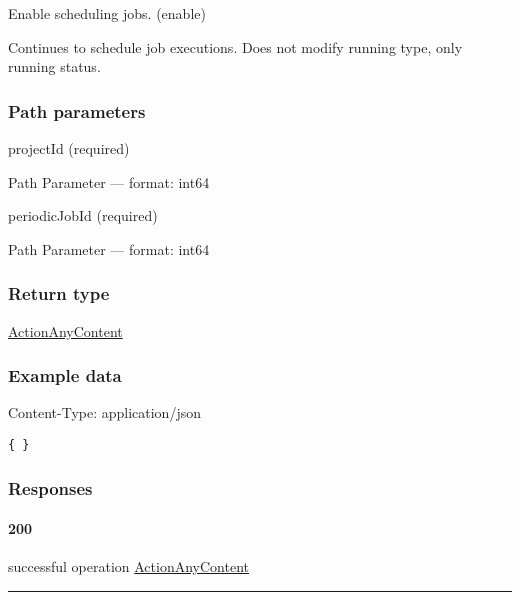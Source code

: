 Enable scheduling jobs. ({enable})

Continues to schedule job executions. Does not modify running type, only
running status.

\hypertarget{path-parameters-13}{%
\subsubsection*{Path parameters}\label{path-parameters-13}}

projectId (required)

{Path Parameter} --- format: int64

periodicJobId (required)

{Path Parameter} --- format: int64

\hypertarget{return-type-15}{%
\subsubsection*{Return type}\label{return-type-15}}

\protect\hyperlink{ActionAnyContent}{ActionAnyContent}

\hypertarget{example-data-15}{%
\subsubsection*{Example data}\label{example-data-15}}

Content-Type: application/json

\begin{verbatim}
{ }
\end{verbatim}

\hypertarget{responses-15}{%
\subsubsection*{Responses}\label{responses-15}}

\hypertarget{section-54}{%
\paragraph{200}\label{section-54}}

successful operation
\protect\hyperlink{ActionAnyContent}{ActionAnyContent}

\begin{center}\rule{0.5\linewidth}{0.5pt}\end{center}

\protect\hypertarget{getPeriodicJobs}{}{}



